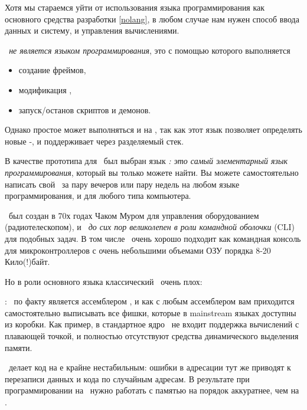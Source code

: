 \clearpage
{}\secdown

Хотя мы стараемся уйти от использования языка программирования как основного
средства разработки \ref{nolang}, в любом случае нам нужен способ ввода данных и
систему, и управления вычислениями.

\emph{\metal\ не является языком
программирования}, это  с помощью которого выполняется
\begin{itemize}[nosep]
  \item 
создание фреймов, 
  \item 
модификация , 
  \item 
запуск/останов скриптов и демонов. 
\end{itemize}

\medskip\noindent
Однако простое  может выполняться и на
\metal, так как этот язык позволяет определять новые \F-, и
поддерживает  через разделяемый стек.

\clearpage
В качестве прототипа для \metal\ был выбран язык \emph{\F: это самый
элементарный язык программирования}, который вы только можете найти. Вы можете
самостоятельно написать свой \F\ за пару вечеров или пару недель на любом языке
программирования, и для любого типа компьютера.

\F\ был создан в 70х годах Чаком Муром для управления оборудованием
(радиотелескопом), и \emph{\F\ до сих пор великолепен в роли командной оболочки}
(CLI) для подобных задач. В том числе \F\ очень хорошо подходит как командная
консоль для микроконтроллеров с очень небольшими объемами ОЗУ порядка 8-20
Кило(!)байт.

\noindent
Но в роли основного языка классический \F\ очень плох:
\begin{description}[nosep]
\item[низкоуровневая модель ВМ языка]: \F\ по факту является ассемблером
, и как с любым ассемблером вам приходится
самостоятельно выписывать все фишки, которые в mainstream языках доступны из
коробки. Как пример, в стандартное ядро \F\ не входит поддержка вычислений с
плавающей точкой, и полностью отсутствуют средства динамического выделения
памяти.
\item[прямой доступ к памяти по адресам]\ делает код на \F е крайне
нестабильным: ошибки в адресации тут же приводят к перезаписи данных и кода по
случайным адресам. В результате при программировании на \F\ нужно работать с
памятью на порядок аккуратнее, чем на \emc.
\end{description}

